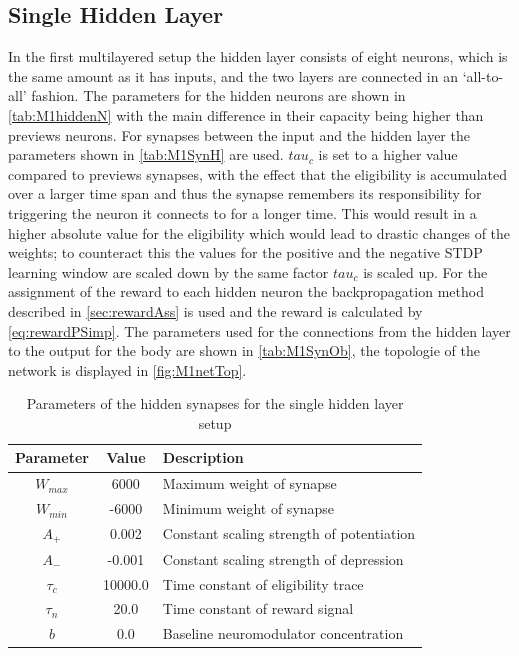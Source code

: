 \subsection{Single Hidden Layer}
In the first multilayered setup the hidden layer consists of eight neurons, which is the same amount as it has inputs, and the two layers are connected in an ‘all-to-all’ fashion. The parameters for the hidden neurons are shown in \autoref{tab:M1hiddenN} with the main difference in their capacity being higher than previews neurons. For synapses between the input and the hidden layer the parameters shown in \autoref{tab:M1SynH} are used. $tau_{c}$ is set to a higher value compared to previews synapses, with the effect that the eligibility is accumulated over a larger time span and thus the synapse remembers its responsibility for triggering the neuron it connects to for a longer time. This would result in a higher absolute value for the eligibility which would lead to drastic changes of the weights; to counteract this the values for the positive and the negative STDP learning window are scaled down by the same factor $tau_{c}$ is scaled up. For the assignment of the reward to each hidden neuron the backpropagation method described in \autoref{sec:rewardAss} is used and the reward is calculated by \autoref{eq:rewardPSimp}. The parameters used for the connections from the hidden layer to the output for the body are shown in \autoref{tab:M1SynOb}, the topologie of the network is displayed in \autoref{fig:M1netTop}.
\begin{table}[htpb]
  \centering
  \caption[Parameters Single Hidden Layer]{Parameters of the hidden synapses for the single hidden layer setup} \label{tab:M1SynH}
  \begin{tabular}{|c| c |l|}
      \toprule
      Parameter  & Value & Description \\
      \midrule
      $W_{max}$ & 6000   & Maximum weight of synapse\\   
      $W_{min}$ & -6000  & Minimum weight of synapse\\   
      $A_{+}$   & 0.002    & Constant scaling strength of potentiation\\   
      $A_{-}$   & -0.001   & Constant scaling strength of depression \\   
      $\tau_c$  & 10000.0   & Time constant of eligibility trace \\  
      $\tau_n$  & 20.0   & Time constant of reward signal  \\   
      $b$       & 0.0    & Baseline neuromodulator concentration \\    
      \bottomrule
  \end{tabular}
\end{table}
  
